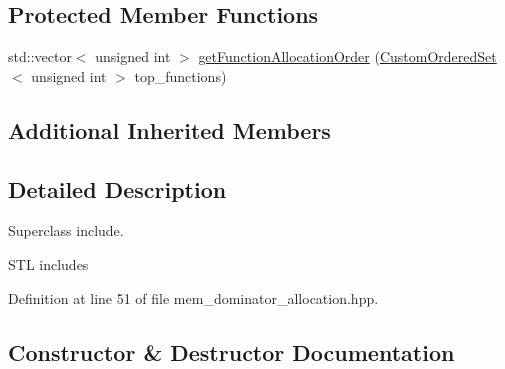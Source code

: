 \subsection*{Protected Member Functions}
\begin{DoxyCompactItemize}
\item 
std\+::vector$<$ unsigned int $>$ \hyperlink{classmem__dominator__allocation_a5cc28dbe6aa36df89b08e2673c636a64}{get\+Function\+Allocation\+Order} (\hyperlink{classCustomOrderedSet}{Custom\+Ordered\+Set}$<$ unsigned int $>$ top\+\_\+functions)
\end{DoxyCompactItemize}
\subsection*{Additional Inherited Members}


\subsection{Detailed Description}
Superclass include. 

S\+TL includes 

Definition at line 51 of file mem\+\_\+dominator\+\_\+allocation.\+hpp.



\subsection{Constructor \& Destructor Documentation}
\mbox{\label{classmem__dominator__allocation_ab513e5b2281e3ae087e6721df28bd3b9}} 
